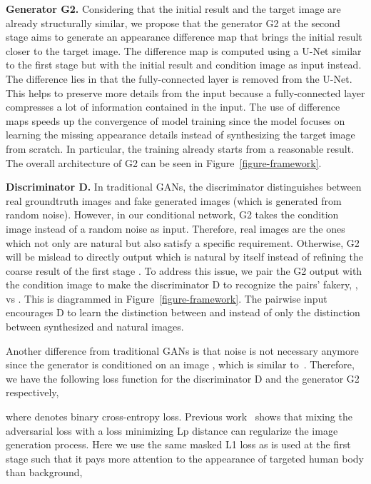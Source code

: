 \documentclass{article}
\newcommand{\myparagraph}[1]{\vspace{0.0em}\noindent\textbf{#1}}
\begin{document}
\myparagraph{Generator G2.}
Considering that the initial result and the target image are already structurally similar, we propose that the generator G2 at the second stage aims to generate an appearance difference map that brings the initial result closer to the target image. The difference map is computed using a U-Net similar to the first stage but with the initial result  and condition image  as input instead. The difference lies in that the fully-connected layer is removed from the U-Net. This helps to preserve more details from the input because a fully-connected layer compresses a lot of information contained in the input. The use of difference maps speeds up the convergence of model training since the model focuses on learning the missing appearance details instead of synthesizing the target image from scratch. 
In particular, the training already starts from a reasonable result. 
The overall architecture of G2 can be seen in Figure~\ref{figure-framework}.

\myparagraph{Discriminator D.} 
In traditional GANs, the discriminator distinguishes between real groundtruth images and fake generated images (which is generated from random noise). However, in our conditional network, G2 takes the condition image  instead of a random noise as input. Therefore, real images are the ones which not only are natural but also satisfy a specific requirement. Otherwise, G2 will be mislead to directly output  which is natural by itself instead of refining the coarse result of the first stage .
To address this issue, we pair the G2 output with the condition image to make the discriminator D to recognize the pairs' fakery, ,  vs . This is diagrammed in Figure~\ref{figure-framework}. 
The pairwise input encourages D to learn the distinction between  and  instead of only the distinction between synthesized and natural images.

Another difference from traditional GANs is that noise is not necessary anymore since the generator is conditioned on an image , which is similar to~\cite{Mathieu-ICLR16}.
Therefore, we have the following loss function for the discriminator D and the generator G2 respectively,
 
where  denotes binary cross-entropy loss.
Previous work~\cite{Isola-CVPR16-Pix2pix, Mathieu-ICLR16} shows that mixing the adversarial loss with a loss minimizing Lp distance can regularize the image generation process. Here we use the same masked L1 loss as is used at the first stage such that it pays more attention to the appearance of targeted human body than background,
\end{document}
